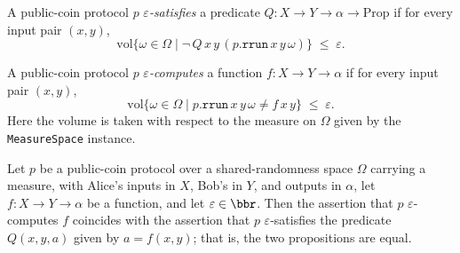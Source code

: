 \begin{definition}
\label{CommunicationComplexity.PublicCoin.Protocol.ApproxSatisfies}
\leanok
{}
A public-coin protocol $p$ \emph{$\varepsilon$-satisfies} a predicate
$Q : X \to Y \to \alpha \to \mathrm{Prop}$ if for every input pair $(x, y)$,
\[
  \mathrm{vol}\bigl\{\omega \in \Omega \mid \neg\, Q\,x\,y\,(p.\texttt{rrun}\,x\,y\,\omega)\bigr\} \;\le\; \varepsilon.
\]
\end{definition}

\begin{definition}
\label{CommunicationComplexity.PublicCoin.Protocol.ApproxComputes}
\leanok
{}
A public-coin protocol $p$ \emph{$\varepsilon$-computes} a function
$f : X \to Y \to \alpha$ if for every input pair $(x, y)$,
\[
  \mathrm{vol}\bigl\{\omega \in \Omega \mid p.\texttt{rrun}\,x\,y\,\omega \ne f\,x\,y\bigr\} \;\le\; \varepsilon.
\]
Here the volume is taken with respect to the measure on $\Omega$ given by the
\texttt{MeasureSpace} instance.
\end{definition}

\begin{theorem}
\label{CommunicationComplexity.PublicCoin.Protocol.ApproxComputes_eq_ApproxSatisfies}
\leanok
{}
Let $p$ be a public-coin protocol over a shared-randomness space $\Omega$ carrying a
measure, with Alice's inputs in $X$, Bob's in $Y$, and outputs in $\alpha$, let $f : X
\to Y \to \alpha$ be a function, and let $\varepsilon \in \bbr$. Then the assertion that
$p$ $\varepsilon$-computes $f$ coincides with the assertion that $p$
$\varepsilon$-satisfies the predicate $Q(x, y, a)$ given by $a = f(x, y)$; that is, the
two propositions are equal.
\end{theorem}

